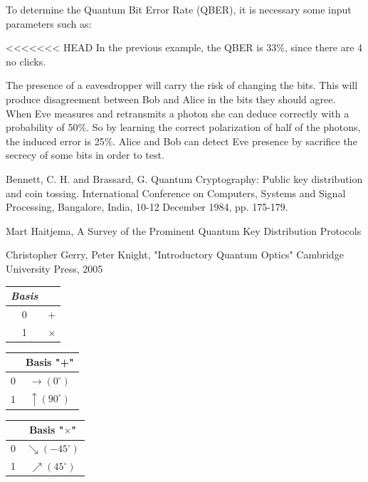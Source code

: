 	To determine the Quantum Bit Error Rate (QBER), it is necessary some input parameters such as:
	
<<<<<<< HEAD
	In the previous example, the QBER is 33$\%$, since there are 4 no clicks.	

The presence of a eavesdropper will carry the risk of changing the bits. This will produce disagreement between Bob and Alice in the bits they should agree. When Eve measures and retransmits a photon she can deduce correctly with a probability of 50\%. So by learning the correct polarization of half of the photons, the induced error is 25\%. Alice and Bob can detect Eve presence by sacrifice the secrecy of some bits in order to test.

\begin{thebibliography}{2}
Bennett, C. H. and Brassard,
G. Quantum Cryptography: Public key distribution and coin tossing.
International Conference on Computers, Systems and Signal Processing, Bangalore, India, 10-12 December 1984, pp. 175-179.

Mart Haitjema, A Survey of the Prominent Quantum Key Distribution Protocols

Christopher Gerry, Peter Knight, "Introductory Quantum Optics" Cambridge University Press, 2005

\end{thebibliography}
\cleardoublepage

\begin{table}[H]
\centering
\begin{tabular}{c|c}
\textbf{\textit{Basis}}         &  \\ \hline
 0 & $+$ \\
 1 & $\times$ \\
\end{tabular}
\end{table}


\begin{table}[H]
\centering
\begin{tabular}{c|c}
            & Basis "+" \\ \hline
 0 & $\to (0^{\circ})$ \\
 1 & $\uparrow (90^{\circ})$ \\
\end{tabular}
\end{table}


\begin{table}[H]
\centering
\begin{tabular}{c|c}
      & Basis "$\times$" \\ \hline
 0 & $\searrow (-45^{\circ})$ \\
 1 & $\nearrow (45^{\circ})$ \\
\end{tabular}
\end{table}


